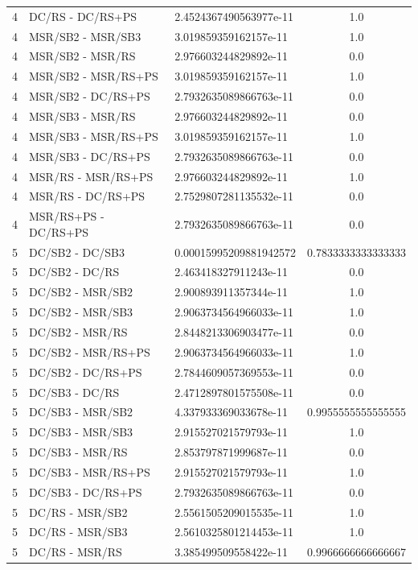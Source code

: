 \documentclass[10pt,a4paper]{article}
\begin{document}
\begin{longtable}{c l l c}
4 & DC/RS - DC/RS+PS & 2.4524367490563977e-11 & 1.0 \\
4 & MSR/SB2 - MSR/SB3 & 3.019859359162157e-11 & 1.0 \\
4 & MSR/SB2 - MSR/RS & 2.976603244829892e-11 & 0.0 \\
4 & MSR/SB2 - MSR/RS+PS & 3.019859359162157e-11 & 1.0 \\
4 & MSR/SB2 - DC/RS+PS & 2.7932635089866763e-11 & 0.0 \\
4 & MSR/SB3 - MSR/RS & 2.976603244829892e-11 & 0.0 \\
4 & MSR/SB3 - MSR/RS+PS & 3.019859359162157e-11 & 1.0 \\
4 & MSR/SB3 - DC/RS+PS & 2.7932635089866763e-11 & 0.0 \\
4 & MSR/RS - MSR/RS+PS & 2.976603244829892e-11 & 1.0 \\
4 & MSR/RS - DC/RS+PS & 2.7529807281135532e-11 & 0.0 \\
4 & MSR/RS+PS - DC/RS+PS & 2.7932635089866763e-11 & 0.0 \\
\midrule
5 & DC/SB2 - DC/SB3 & 0.00015995209881942572 & 0.7833333333333333 \\
5 & DC/SB2 - DC/RS & 2.463418327911243e-11 & 0.0 \\
5 & DC/SB2 - MSR/SB2 & 2.900893911357344e-11 & 1.0 \\
5 & DC/SB2 - MSR/SB3 & 2.9063734564966033e-11 & 1.0 \\
5 & DC/SB2 - MSR/RS & 2.8448213306903477e-11 & 0.0 \\
5 & DC/SB2 - MSR/RS+PS & 2.9063734564966033e-11 & 1.0 \\
5 & DC/SB2 - DC/RS+PS & 2.7844609057369553e-11 & 0.0 \\
5 & DC/SB3 - DC/RS & 2.4712897801575508e-11 & 0.0 \\
5 & DC/SB3 - MSR/SB2 & 4.337933369033678e-11 & 0.9955555555555555 \\
5 & DC/SB3 - MSR/SB3 & 2.915527021579793e-11 & 1.0 \\
5 & DC/SB3 - MSR/RS & 2.853797871999687e-11 & 0.0 \\
5 & DC/SB3 - MSR/RS+PS & 2.915527021579793e-11 & 1.0 \\
5 & DC/SB3 - DC/RS+PS & 2.7932635089866763e-11 & 0.0 \\
5 & DC/RS - MSR/SB2 & 2.5561505209015535e-11 & 1.0 \\
5 & DC/RS - MSR/SB3 & 2.5610325801214453e-11 & 1.0 \\
5 & DC/RS - MSR/RS & 3.385499509558422e-11 & 0.9966666666666667 \\

\end{longtable}
\end{document}
